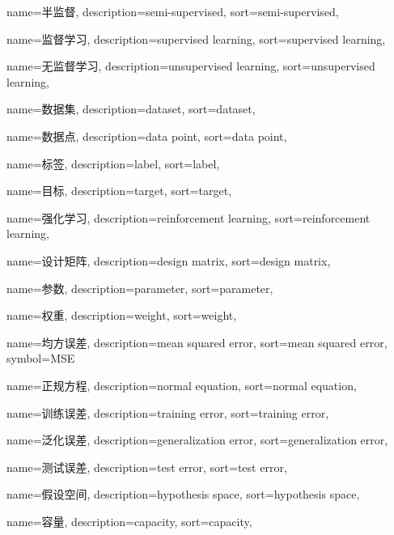 {
  name=半监督,
  description={semi-supervised},
  sort={semi-supervised},
}

{
  name=监督学习,
  description={supervised learning},
  sort={supervised learning},
}

{
  name=无监督学习,
  description={unsupervised learning},
  sort={unsupervised learning},
}

{
  name=数据集,
  description={dataset},
  sort={dataset},
}

{
  name=数据点,
  description={data point},
  sort={data point},
}

{
  name=标签,
  description={label},
  sort={label},
}

{
  name=目标,
  description={target},
  sort={target},
}

{
  name=强化学习,
  description={reinforcement learning},
  sort={reinforcement learning},
}

{
  name=设计矩阵,
  description={design matrix},
  sort={design matrix},
}

{
  name=参数,
  description={parameter},
  sort={parameter},
}

{
  name=权重,
  description={weight},
  sort={weight},
}

{
  name=均方误差,
  description={mean squared error},
  sort={mean squared error},
  symbol={MSE}
}

{
  name=正规方程,
  description={normal equation},
  sort={normal equation},
}

{
  name=训练误差,
  description={training error},
  sort={training error},
}

{
  name=泛化误差,
  description={generalization error},
  sort={generalization error},
}

{
  name=测试误差,
  description={test error},
  sort={test error},
}

{
  name=假设空间,
  description={hypothesis space},
  sort={hypothesis space},
}

{
  name=容量,
  description={capacity},
  sort={capacity},
}


